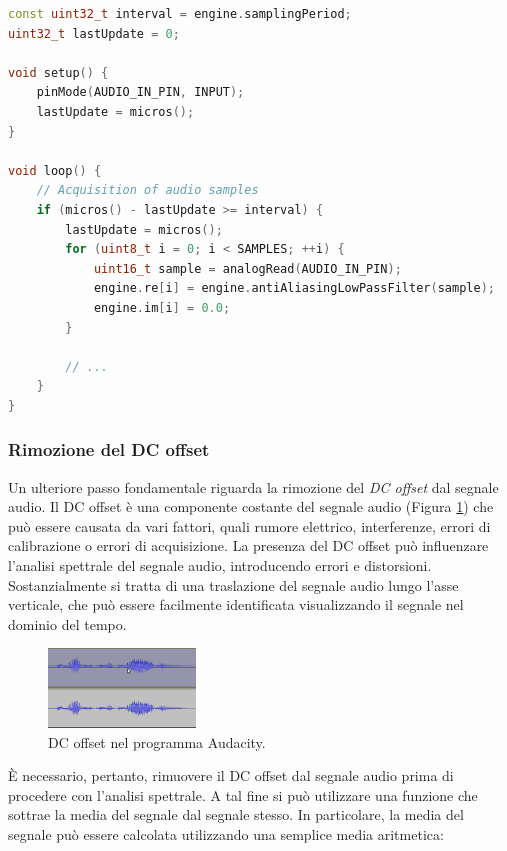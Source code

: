 \documentclass[a4paper,12pt]{report}  %
\begin{document}
\begin{lstlisting}[language=C++,keywords={antiAliasingLowPassFilter, const, uint8_t, if, for, void, Serial, begin, uint16_t, analogRead, println, uint32_t, micros, pinMode, INPUT}]
const uint32_t interval = engine.samplingPeriod;
uint32_t lastUpdate = 0;

void setup() {
    pinMode(AUDIO_IN_PIN, INPUT);
    lastUpdate = micros();
}

void loop() {
    // Acquisition of audio samples
    if (micros() - lastUpdate >= interval) {
        lastUpdate = micros();
        for (uint8_t i = 0; i < SAMPLES; ++i) {
            uint16_t sample = analogRead(AUDIO_IN_PIN);
            engine.re[i] = engine.antiAliasingLowPassFilter(sample);
            engine.im[i] = 0.0;
        }
     
        // ...
    }
}
\end{lstlisting}

\subsubsection{Rimozione del DC offset}\label{sec:dc_offset}
Un ulteriore passo fondamentale riguarda la rimozione del \textit{DC offset} dal segnale audio.
Il DC offset è una componente costante del segnale audio (Figura \ref{fig:dc_offset}) che può essere causata da vari fattori, quali rumore elettrico, interferenze, errori di calibrazione o errori di acquisizione.
La presenza del DC offset può influenzare l'analisi spettrale del segnale audio, introducendo errori e distorsioni.
Sostanzialmente si tratta di una traslazione del segnale audio lungo l'asse verticale, che può essere facilmente identificata visualizzando il segnale nel dominio del tempo.

\begin{figure}[h]
    \centering
    \includegraphics[width=0.35\textwidth]{imgs/dc_offset-audacity.png}
    \caption{DC offset nel programma Audacity.}
    \label{fig:dc_offset}
\end{figure}

È necessario, pertanto, rimuovere il DC offset dal segnale audio prima di procedere con l'analisi spettrale.
A tal fine si può utilizzare una funzione che sottrae la media del segnale dal segnale stesso.
In particolare, la media del segnale può essere calcolata utilizzando una semplice media aritmetica:
\end{document}
